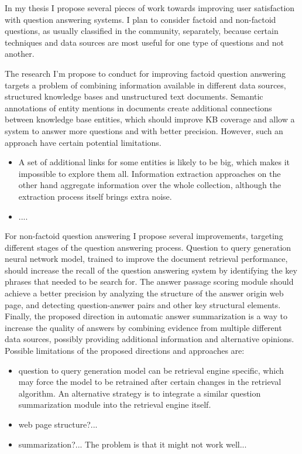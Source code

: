 %

\label{chapter:discussion}

\noindent

In my thesis I propose several pieces of work towards improving user satisfaction with question answering systems.
I plan to consider factoid and non-factoid questions, as usually classified in the community, separately, because certain techniques and data sources are most useful for one type of questions and not another.

The research I'm propose to conduct for improving factoid question answering targets a problem of combining information available in different data sources, \ie structured knowledge bases and unstructured text documents.
Semantic annotations of entity mentions in documents create additional connections between knowledge base entities, which should improve KB coverage and allow a system to answer more questions and with better precision.
However, such an approach have certain potential limitations.
\begin{itemize}
\item A set of additional links for some entities is likely to be big, which makes it impossible to explore them all. Information extraction approaches on the other hand aggregate information over the whole collection, although the extraction process itself brings extra noise.
\item ....
\end{itemize}

For non-factoid question answering I propose several improvements, targeting different stages of the question answering process.
Question to query generation neural network model, trained to improve the document retrieval performance, should increase the recall of the question answering system by identifying the key phrases that needed to be search for.
The answer passage scoring module should achieve a better precision by analyzing the structure of the answer origin web page, and detecting question-answer pairs and other key structural elements.
Finally, the proposed direction in automatic answer summarization is a way to increase the quality of answers by combining evidence from multiple different data sources, possibly providing additional information and alternative opinions.
Possible limitations of the proposed directions and approaches are:
\begin{itemize}
\item question to query generation model can be retrieval engine specific, which may force the model to be retrained after certain changes in the retrieval algorithm. An alternative strategy is to integrate a similar question summarization module into the retrieval engine itself.
\item web page structure?...
\item summarization?... The problem is that it might not work well...
\end{itemize}

